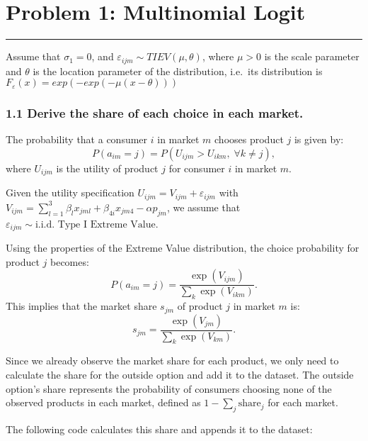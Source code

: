 \documentclass[
]{article}
\begin{document}
\section{Problem 1: Multinomial
Logit}\label{problem-1-multinomial-logit}

\begin{center}\rule{0.5\linewidth}{0.5pt}\end{center}

Assume that \(\sigma_1 = 0\), and
\(\varepsilon_{ijm} \sim TIEV(\mu, \theta)\), where \(\mu>0\) is the
scale parameter and \(\theta\) is the location parameter of the
distribution, i.e.~its distribution is
\(F_{\varepsilon}(x) = exp(-exp(-\mu(x-\theta)))\)

\subsubsection{1.1 Derive the share of each choice in each
market.}\label{derive-the-share-of-each-choice-in-each-market.}

The probability that a consumer \(i\) in market \(m\) chooses product \(j\) is given by:
\[
P(a_{im} = j) = P\left(U_{ijm} > U_{ikm}, \; \forall k \neq j\right),
\]
where \( U_{ijm} \) is the utility of product \(j\) for consumer \(i\) in market \(m\).

Given the utility specification \( U_{ijm} = V_{ijm} + \varepsilon_{ijm} \) with \( V_{ijm} = \sum_{l=1}^{3} \beta_l x_{jml} + \beta_{4i} x_{jm4} - \alpha p_{jm} \), we assume that \( \varepsilon_{ijm} \sim \text{i.i.d. Type I Extreme Value} \).

Using the properties of the Extreme Value distribution, the choice probability for product \( j \) becomes:
\[
P(a_{im} = j) = \frac{\exp(V_{ijm})}{\sum_{k} \exp(V_{ikm})}.
\]
This implies that the market share \(s_{jm}\) of product \(j\) in market \(m\) is:
\[
s_{jm} = \frac{\exp(V_{jm})}{\sum_{k} \exp(V_{km})}.
\]

Since we already observe the market share for each product, we only need
to calculate the share for the outside option and add it to the dataset.
The outside option's share represents the probability of consumers
choosing none of the observed products in each market, defined as
\(1 - \sum_{j} \text{share}_j\) for each market.

The following code calculates this share and appends it to the dataset:
\end{document}
